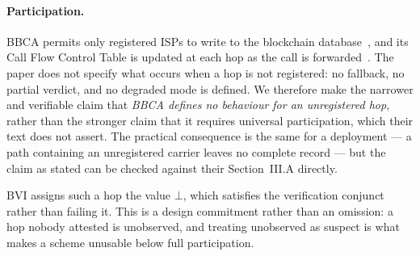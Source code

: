 %


%

\paragraph{Participation.}
BBCA permits only registered ISPs to write to the blockchain
database~\cite[Sec.~III.A]{bbca}, and its Call Flow Control Table is updated at
each hop as the call is forwarded~\cite[Fig.~6]{bbca}. The paper does not
specify what occurs when a hop is not registered: no fallback, no partial
verdict, and no degraded mode is defined. We therefore make the narrower and
verifiable claim that \emph{BBCA defines no behaviour for an unregistered hop},
rather than the stronger claim that it requires universal participation, which
their text does not assert. The practical consequence is the same for a
deployment --- a path containing an unregistered carrier leaves no complete
record --- but the claim as stated can be checked against their Section~III.A
directly.

BVI assigns such a hop the value $\bot$, which satisfies the verification
conjunct rather than failing it. This is a design commitment rather than an
omission: a hop nobody attested is unobserved, and treating unobserved as
suspect is what makes a scheme unusable below full participation.


%

